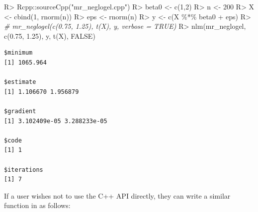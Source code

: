 \documentclass[article]{jss}
\newenvironment{Shaded}{\begin{snugshade}}{\end{snugshade}}
\newcommand{\CommentTok}[1]{\textcolor[rgb]{0.56,0.35,0.01}{\textit{#1}}}
\newcommand{\ConstantTok}[1]{\textcolor[rgb]{0.00,0.00,0.00}{#1}}
\newcommand{\DecValTok}[1]{\textcolor[rgb]{0.00,0.00,0.81}{#1}}
\newcommand{\FloatTok}[1]{\textcolor[rgb]{0.00,0.00,0.81}{#1}}
\newcommand{\FunctionTok}[1]{\textcolor[rgb]{0.00,0.00,0.00}{#1}}
\newcommand{\NormalTok}[1]{#1}
\newcommand{\OtherTok}[1]{\textcolor[rgb]{0.56,0.35,0.01}{#1}}
\newcommand{\SpecialCharTok}[1]{\textcolor[rgb]{0.00,0.00,0.00}{#1}}
\newcommand{\StringTok}[1]{\textcolor[rgb]{0.31,0.60,0.02}{#1}}
\renewcommand{\|}{\,|\,}
\begin{document}
\begin{Shaded}
\begin{Highlighting}[]
\NormalTok{R}\SpecialCharTok{\textgreater{}}\NormalTok{ Rcpp}\SpecialCharTok{::}\FunctionTok{sourceCpp}\NormalTok{(}\StringTok{"mr\_neglogel.cpp"}\NormalTok{)}
\NormalTok{R}\SpecialCharTok{\textgreater{}}\NormalTok{ beta0 }\OtherTok{\textless{}{-}} \FunctionTok{c}\NormalTok{(}\DecValTok{1}\NormalTok{,}\DecValTok{2}\NormalTok{)}
\NormalTok{R}\SpecialCharTok{\textgreater{}}\NormalTok{ n }\OtherTok{\textless{}{-}} \DecValTok{200}
\NormalTok{R}\SpecialCharTok{\textgreater{}}\NormalTok{ X }\OtherTok{\textless{}{-}} \FunctionTok{cbind}\NormalTok{(}\DecValTok{1}\NormalTok{, }\FunctionTok{rnorm}\NormalTok{(n))}
\NormalTok{R}\SpecialCharTok{\textgreater{}}\NormalTok{ eps }\OtherTok{\textless{}{-}} \FunctionTok{rnorm}\NormalTok{(n)}
\NormalTok{R}\SpecialCharTok{\textgreater{}}\NormalTok{ y }\OtherTok{\textless{}{-}} \FunctionTok{c}\NormalTok{(X }\SpecialCharTok{\%*\%}\NormalTok{ beta0 }\SpecialCharTok{+}\NormalTok{ eps)}
\NormalTok{R}\SpecialCharTok{\textgreater{}} \CommentTok{\# mr\_neglogel(c(0.75, 1.25), t(X), y, verbose = TRUE)}
\NormalTok{R}\SpecialCharTok{\textgreater{}} \FunctionTok{nlm}\NormalTok{(mr\_neglogel, }\FunctionTok{c}\NormalTok{(}\FloatTok{0.75}\NormalTok{, }\FloatTok{1.25}\NormalTok{), y, }\FunctionTok{t}\NormalTok{(X), }\ConstantTok{FALSE}\NormalTok{)}
\end{Highlighting}
\end{Shaded}

\begin{verbatim}
$minimum
[1] 1065.964

$estimate
[1] 1.106670 1.956879

$gradient
[1] 3.102409e-05 3.288233e-05

$code
[1] 1

$iterations
[1] 7
\end{verbatim}

If a user wishes not to use the C++ API directly, they can write a similar function in  as follows:
\end{document}
